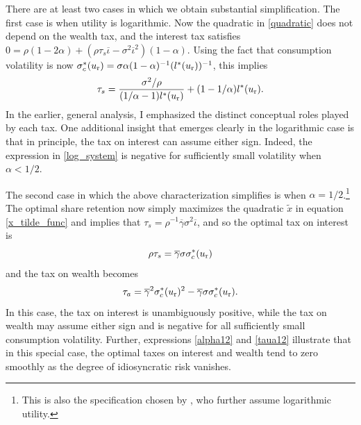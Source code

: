 \documentclass[11pt]{article}
\theoremstyle{plain}
\begin{document}

There are at least two cases in which we obtain substantial simplification. The first case is when utility is logarithmic. Now the quadratic in \eqref{quadratic} does not depend on the wealth tax, and the interest tax satisfies $0 = \rho(1 - 2\alpha) + {\left(\rho \tau_s \overline{\iota} - \sigma^2 \overline{\iota}^2\right)}(1-\alpha)$. Using the fact that consumption volatility is now $\sigma_c^*(u_{\textnormal{r}}) = \sigma \alpha (1-\alpha)^{-1}(l^*(u_{\textnormal{r}}))^{-1}$, this implies
\begin{equation}
\tau_s = \frac{\sigma^2/\rho}{(1/\alpha-1)l^*(u_{\textnormal{r}})} + (1 - 1/\alpha)l^*(u_{\textnormal{r}}).
\label{log_system}
\end{equation}
In the earlier, general analysis, I emphasized the distinct conceptual roles played by each tax. One additional insight that emerges clearly in the logarithmic case is that in principle, the tax on interest can assume either sign. Indeed, the expression in \eqref{log_system} is negative for sufficiently small volatility when $\alpha < 1/2$. 

The second case in which the above characterization simplifies is when $\alpha=1/2$.\footnote{This is also the specification chosen by \cite{jones_schumpeterian_2018}, who further assume logarithmic utility.} The optimal share retention now simply maximizes the quadratic $\tilde{x}$ in equation \eqref{x_tilde_func} and implies that $\tau_s = \rho^{-1} \overline{\gamma} \sigma^2 \overline{\iota}$, and so the optimal tax on interest is
\begin{equation} 
\rho \tau_s = \overline{\gamma} \sigma \sigma_c^*(u_{\textnormal{r}})
\label{alpha12}
\end{equation} 
and the tax on wealth becomes
\begin{equation}
\tau_a = \overline{\gamma}^2 \sigma_c^*(u_{\textnormal{r}})^2 - \overline{\gamma} \sigma \sigma_c^*(u_{\textnormal{r}}).
\label{taua12}
\end{equation}
In this case, the tax on interest is unambiguously positive, while the tax on wealth may assume either sign and is negative for all sufficiently small consumption volatility. Further, expressions \eqref{alpha12} and \eqref{taua12} illustrate that in this special case, the optimal taxes on interest and wealth tend to zero smoothly as the degree of idiosyncratic risk vanishes. 
\end{document}
